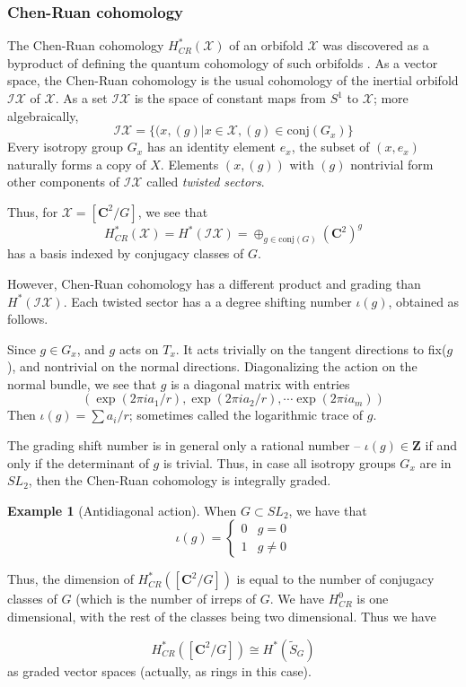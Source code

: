 \documentclass{amsart}[12pt]
\theoremstyle{definition}
\newtheorem{example}[dummy]{Example}
\newcommand{\Z}{\mathbf{Z}}
\newcommand{\C}{\mathbf{C}}
\begin{document}
\subsubsection{Chen-Ruan cohomology}

The Chen-Ruan cohomology $H_{CR}^*(\mathcal{X})$ of an orbifold $\mathcal{X}$ was discovered as a byproduct of defining the quantum cohomology of such orbifolds \cite{chenruancohomology}.  As a vector space, the Chen-Ruan cohomology is the usual cohomology of the inertial orbifold $\mathcal{IX}$ of $\mathcal{X}$.  As a set $\mathcal{IX}$ is the space of constant maps from $S^1$ to $\mathcal{X}$; more algebraically, 
$$\mathcal{IX}=\{(x, (g)| x\in \mathcal{X}, (g)\in\textrm{conj}(G_x)\}$$
Every isotropy group $G_x$ has an identity element $e_x$, the subset of $(x, e_x)$ naturally forms a copy of $X$.  Elements $(x,(g))$ with $(g)$ nontrivial form other components of $\mathcal{IX}$ called \emph{twisted sectors}.

Thus, for $\mathcal{X}=[\C^2/G]$, we see that 
$$H_{CR}^*(\mathcal{X}) =H^*(\mathcal{IX})=\oplus_{g\in\textrm{conj}(G)} (\C^2)^g$$
has a basis indexed by conjugacy classes of $G$.

However, Chen-Ruan cohomology has a different product and grading than $H^*(\mathcal{IX})$.  Each twisted sector has a a degree shifting number $\iota(g)$, obtained as follows.

Since $g\in G_x$, and $g$ acts on $T_x$.  It acts trivially on the tangent directions to fix($g$), and nontrivial on the normal directions.  Diagonalizing the action on the normal bundle, we see that $g$ is a diagonal matrix with entries 
$$(\exp(2\pi i a_1/r), \exp(2\pi i a_2/r), \cdots \exp(2\pi i a_m))$$
Then $\iota(g)=\sum a_i/r$; sometimes called the logarithmic trace of $g$.

The grading shift number is in general only a rational number -- $\iota(g)\in \Z$ if and only if the determinant of $g$ is trivial.  Thus, in case all isotropy groups $G_x$ are in $SL_2$, then the Chen-Ruan cohomology is integrally graded.

\begin{example}[Antidiagonal action]
When $G\subset SL_2$, we have that 
$$\iota(g)=\left\{\begin{array}{rl} 0 & g=0 \\
1 & g\neq 0 \end{array}\right.
$$

Thus, the dimension of $H_{CR}^*([\C^2/G])$ is equal to the number of conjugacy classes of $G$ (which is the number of irreps of $G$.  We have $H_{CR}^0$ is one dimensional, with the rest of the classes being two dimensional.  Thus we have

$$H_{CR}^*([\C^2/G])\cong H^*(\widetilde{S}_G)$$
as graded vector spaces (actually, as rings in this case).  
\end{example}
\end{document}
